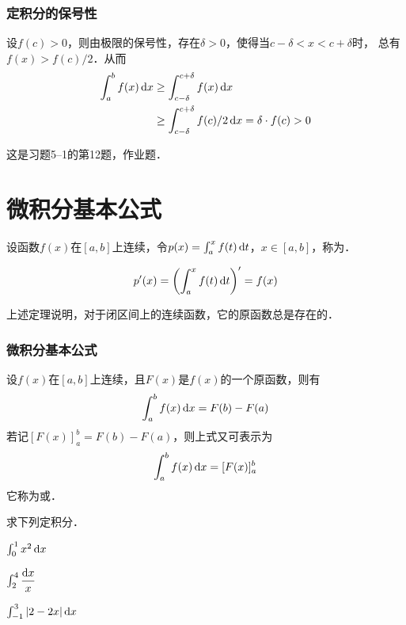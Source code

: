 \documentclass[14pt,notheorems,leqno,xcolor={rgb}]{beamer} %
\begin{document}
\begin{sframe}
\frametitle{定积分的保号性}
\begin{solution}
设$f(c)>0$，则由极限的保号性，存在$\delta>0$，使得当$c-\delta<x<c+\delta$时，
总有$f(x)>f(c)/2$．从而
\begin{align*}
\int_a^b f(x)\mathop{}\!\mathrm{d} x &\ge \int_{c-\delta}^{c+\delta} f(x)\mathop{}\!\mathrm{d} x \\
&\ge\int_{c-\delta}^{c+\delta} f(c)/2 \mathop{}\!\mathrm{d} x =\delta\cdot f(c)>0 
\end{align*}
\end{solution}
\vpause
\begin{remark*}
这是习题5--1的第12题，作业题．
\end{remark*}
\end{sframe}

\section{微积分基本公式}

\begin{frame}
\begin{definition}
设函数$f(x)$在$[a,b]$上连续，令$p(x)=\int_a^x f(t)\mathop{}\!\mathrm{d} t$，$x\in[a,b]$，称为．
\end{definition}\pause
\begin{theorem}
\[ p'(x)=\left(\int_a^x f(t)\mathop{}\!\mathrm{d} t\right)' = f(x)\]
\end{theorem}\pause
\begin{remark}
上述定理说明，对于闭区间上的连续函数，它的原函数总是存在的．
\end{remark}
\end{frame}

\begin{frame}%
\frametitle{微积分基本公式}
\begin{theorem}设$f(x)$在$[a,b]$上连续，且$F(x)$是$f(x)$的一个原函数，则有
\[\int_a^b f(x)\mathop{}\!\mathrm{d} x = F(b)-F(a)\]
若记$[F(x)]_a^b=F(b)-F(a)$，则上式又可表示为
\[\int_a^b f(x)\mathop{}\!\mathrm{d} x = [F(x)]_a^b\]\pause
它称为或．
\end{theorem}
\end{frame}

\begin{frame}
\begin{example}求下列定积分．
\begin{enumlite}
\item $\int_0^1 x^2 \mathop{}\!\mathrm{d} x$
\item $\int_2^4 \dfrac{\mathop{}\!\mathrm{d} x}x$
\item $\int_{-1}^3 |2-2x|\mathop{}\!\mathrm{d} x$
\end{enumlite}
\end{example}
\end{frame}
\end{document}
